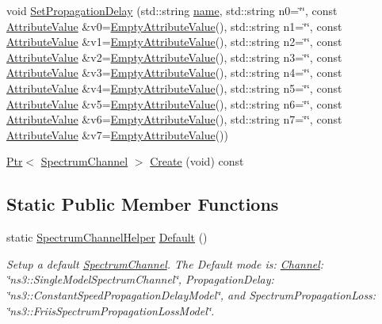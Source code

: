 \begin{DoxyCompactItemize}
void \hyperlink{classns3_1_1SpectrumChannelHelper_a61788598e0bcb0ac0d0530970a0fca2c}{Set\+Propagation\+Delay} (std\+::string \hyperlink{generate__test__data__lte__spectrum__model_8m_ab74e6bf80237ddc4109968cedc58c151}{name}, std\+::string n0=\char`\"{}\char`\"{}, const \hyperlink{classns3_1_1AttributeValue}{Attribute\+Value} \&v0=\hyperlink{classns3_1_1EmptyAttributeValue}{Empty\+Attribute\+Value}(), std\+::string n1=\char`\"{}\char`\"{}, const \hyperlink{classns3_1_1AttributeValue}{Attribute\+Value} \&v1=\hyperlink{classns3_1_1EmptyAttributeValue}{Empty\+Attribute\+Value}(), std\+::string n2=\char`\"{}\char`\"{}, const \hyperlink{classns3_1_1AttributeValue}{Attribute\+Value} \&v2=\hyperlink{classns3_1_1EmptyAttributeValue}{Empty\+Attribute\+Value}(), std\+::string n3=\char`\"{}\char`\"{}, const \hyperlink{classns3_1_1AttributeValue}{Attribute\+Value} \&v3=\hyperlink{classns3_1_1EmptyAttributeValue}{Empty\+Attribute\+Value}(), std\+::string n4=\char`\"{}\char`\"{}, const \hyperlink{classns3_1_1AttributeValue}{Attribute\+Value} \&v4=\hyperlink{classns3_1_1EmptyAttributeValue}{Empty\+Attribute\+Value}(), std\+::string n5=\char`\"{}\char`\"{}, const \hyperlink{classns3_1_1AttributeValue}{Attribute\+Value} \&v5=\hyperlink{classns3_1_1EmptyAttributeValue}{Empty\+Attribute\+Value}(), std\+::string n6=\char`\"{}\char`\"{}, const \hyperlink{classns3_1_1AttributeValue}{Attribute\+Value} \&v6=\hyperlink{classns3_1_1EmptyAttributeValue}{Empty\+Attribute\+Value}(), std\+::string n7=\char`\"{}\char`\"{}, const \hyperlink{classns3_1_1AttributeValue}{Attribute\+Value} \&v7=\hyperlink{classns3_1_1EmptyAttributeValue}{Empty\+Attribute\+Value}())
\item 
\hyperlink{classns3_1_1Ptr}{Ptr}$<$ \hyperlink{classns3_1_1SpectrumChannel}{Spectrum\+Channel} $>$ \hyperlink{classns3_1_1SpectrumChannelHelper_a419ea84f5046763085f94f38af319fb9}{Create} (void) const 
\end{DoxyCompactItemize}
\subsection*{Static Public Member Functions}
\begin{DoxyCompactItemize}
\item 
static \hyperlink{classns3_1_1SpectrumChannelHelper}{Spectrum\+Channel\+Helper} \hyperlink{classns3_1_1SpectrumChannelHelper_abe984e0512bcc18a45a71e06af7a0d80}{Default} ()
\begin{DoxyCompactList}\small\item\em Setup a default \hyperlink{classns3_1_1SpectrumChannel}{Spectrum\+Channel}. The Default mode is\+: \hyperlink{classns3_1_1Channel}{Channel}\+: \char`\"{}ns3\+::\+Single\+Model\+Spectrum\+Channel\char`\"{}, Propagation\+Delay\+: \char`\"{}ns3\+::\+Constant\+Speed\+Propagation\+Delay\+Model\char`\"{}, and Spectrum\+Propagation\+Loss\+: \char`\"{}ns3\+::\+Friis\+Spectrum\+Propagation\+Loss\+Model\char`\"{}. \end{DoxyCompactList}\end{DoxyCompactItemize}
